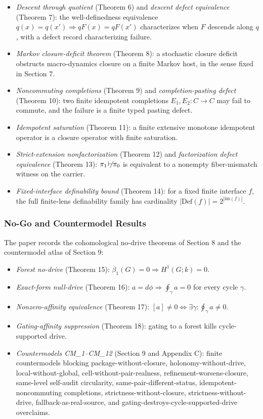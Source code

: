 \documentclass[11pt]{article}
\providecommand{\factor}{\mathrel{\!\vdash\!}}
\providecommand{\tightlist}{}
\theoremstyle{definition}
\begin{document}
\begin{itemize}
\tightlist
\item
  \emph{Descent through quotient} (Theorem 6) and \emph{descent defect equivalence} (Theorem 7): the well-definedness equivalence \(q(x)=q(x')\Rightarrow qF(x)=qF(x')\) characterizes when \(F\) descends along \(q\), with a defect record characterizing failure.
\item
  \emph{Markov closure-deficit theorem} (Theorem 8): a stochastic closure deficit obstructs macro-dynamics closure on a finite Markov host, in the sense fixed in Section 7.
\item
  \emph{Noncommuting completions} (Theorem 9) and \emph{completion-pasting defect} (Theorem 10): two finite idempotent completions \(E_{1},E_{2}:C\to C\) may fail to commute, and the failure is a finite typed pasting defect.
\item
  \emph{Idempotent saturation} (Theorem 11): a finite extensive monotone idempotent operator is a closure operator with finite saturation.
\item
  \emph{Strict-extension nonfactorization} (Theorem 12) and \emph{factorization defect equivalence} (Theorem 13): \(\pi_{1}\not\factor\pi_{0}\) is equivalent to a nonempty fiber-mismatch witness on the carrier.
\item
  \emph{Fixed-interface definability bound} (Theorem 14): for a fixed finite interface \(f\), the full finite-lens definability family has cardinality \(|\mathrm{Def}(f)|=2^{|\mathrm{im}(f)|}\).
\end{itemize}

\subsubsection{No-Go and Countermodel Results}

The paper records the cohomological no-drive theorems of Section 8 and the countermodel atlas of Section 9:

\begin{itemize}
\tightlist
\item
  \emph{Forest no-drive} (Theorem 15): \(\beta_{1}(G)=0\Rightarrow H^{1}(G;k)=0\).
\item
  \emph{Exact-form null-drive} (Theorem 16): \(a=d\phi\Rightarrow\oint_{\gamma}a=0\) for every cycle \(\gamma\).
\item
  \emph{Nonzero-affinity equivalence} (Theorem 17): \([a]\neq 0\iff\exists\gamma:\oint_{\gamma}a\neq 0\).
\item
  \emph{Gating-affinity suppression} (Theorem 18): gating to a forest kills cycle-supported drive.
\item
  \emph{Countermodels CM\_1--CM\_12} (Section 9 and Appendix C): finite countermodels blocking package-without-closure, holonomy-without-drive, local-without-global, cell-without-pair-realness, refinement-worsens-closure, same-level self-audit circularity, same-pair-different-status, idempotent-noncommuting completions, strictness-without-closure, strictness-without-drive, fallback-as-real-source, and gating-destroys-cycle-supported-drive overclaims.
\end{itemize}
\end{document}
